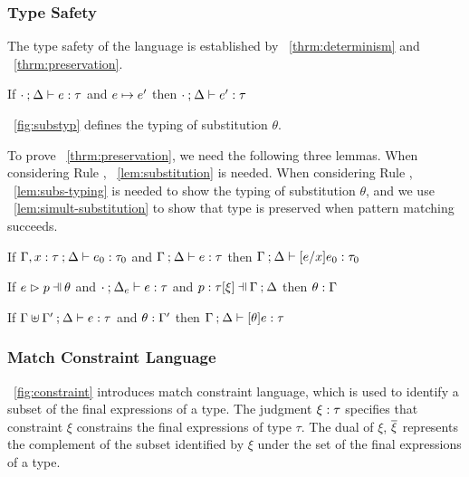 \documentclass[runningheads,envcountsame,a4paper]{llncs}
\begin{document}
\subsubsection{Type Safety}
The type safety of the language is established by
\theoremname~\ref{thrm:determinism} and \theoremname~\ref{thrm:preservation}.

\begin{theorem}[Preservation]
  \label{thrm:preservation}
  If $\cdot \mathbin{;} \Delta \vdash e : \tau$ and $e \mapsto e'$
  then $\cdot \mathbin{;} \Delta \vdash e' : \tau$
\end{theorem}



\figurename~\ref{fig:substyp} defines the typing of substitution $\theta$.

To prove \theoremname~\ref{thrm:preservation}, we need the following three lemmas.
When considering Rule \ITAp, \lemmaname~\ref{lem:substitution} is needed.
When considering Rule \ITSuccMatch, \lemmaname~\ref{lem:subs-typing} is needed
to show the typing of substitution $\theta$, and we use
\lemmaname~\ref{lem:simult-substitution} to show that type is preserved when pattern
matching succeeds.

\begin{lemma}[Substitution]
  \label{lem:substitution}
  If $\Gamma, x : \tau \mathbin{;} \Delta \vdash e_0 : \tau_0$ and $\Gamma \mathbin{;} \Delta \vdash e : \tau$
  then $\Gamma \mathbin{;} \Delta \vdash [e/x]e_0 : \tau_0$
\end{lemma}

\begin{lemma}
  \label{lem:subs-typing}
  If $\hpatmatch{e}{p}{\theta}$ and $\cdot \mathbin{;} \Delta_e \vdash e : \tau$ and $\chpattyp{p}{\tau}{\xi}{\Gamma}{\Delta}$
  then $\theta : \Gamma$
\end{lemma}

\begin{lemma}
  \label{lem:simult-substitution}
  If $\Gamma \uplus \Gamma' \mathbin{;} \Delta \vdash e : \tau$ and $\theta : \Gamma'$
  then $\Gamma \mathbin{;} \Delta \vdash [\theta]e : \tau$
\end{lemma}

\subsubsection{Match Constraint Language}\label{sec:constraint}


\figurename~\ref{fig:constraint} introduces match constraint language, which is
used to identify a subset of the final expressions of a type. The judgment
$\xi : \tau$ specifies that constraint $\xi$ constrains the final
expressions of type $\tau$. The dual of $\xi$, $\overline{\xi}$ represents the
complement of the subset identified by $\xi$ under the set of the final
expressions of a type.
\end{document}
